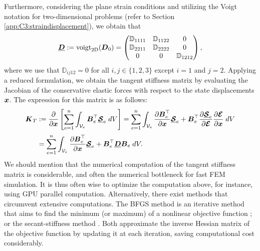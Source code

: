 %
Furthermore, considering the plane strain conditions and utilizing the Voigt notation for two-dimensional problems (refer to Section \ref{app:C3:straindisplacement}), we obtain that
%
\begin{equation}
\underline{{\boldsymbol{D}}} := \textrm{voigt}_{\textrm{2D}}({\boldsymbol{D}}_0) = \begin{pmatrix}
\mathbb{D}_{1111} & \mathbb{D}_{1122} & 0 \\
\mathbb{D}_{2211} & \mathbb{D}_{2222} & 0 \\
0 & 0 & \mathbb{D}_{1212} 
\end{pmatrix},
\end{equation}
where we use that $\mathbb{D}_{ij12} = 0$ for all $i,j \in \{1,2,3\}$ except $i=1$ and $j=2$. Applying a reduced formulation, we obtain the tangent stiffness matrix by evaluating the Jacobian of the conservative elastic forces with respect to the state displacements ${\boldsymbol{x}}$. The expression for this matrix is as follows:
%
\begin{align}
{\boldsymbol{K}}_T & := \frac{\partial}{\partial {\boldsymbol{x}}}  \left[ \sum_{e=1}^{n} \int_{\mathcal{V}_e} {\boldsymbol{B}}_e^\top \underline{\boldsymbol{\mathcal{S}}}_e \; dV \right] = \sum_{e=1}^{n} \int_{\mathcal{V}_e} \frac{\partial {\boldsymbol{B}}_e^\top}{\partial {\boldsymbol{x}}} \underline{\boldsymbol{\mathcal{S}}}_e +  {\boldsymbol{B}}_e^\top \frac{\partial \underline{\boldsymbol{\mathcal{S}}}_e}{\partial \boldsymbol{\mathcal{E}}} \frac{\partial \boldsymbol{\mathcal{E}}}{\partial {\boldsymbol{x}}} \; dV \notag \\[0.25em]
& = \sum_{e=1}^{n} \int_{\mathcal{V}_e} \frac{\partial {\boldsymbol{B}}_e^\top}{\partial {\boldsymbol{x}}} \underline{\boldsymbol{\mathcal{S}}}_e +  {\boldsymbol{B}}_e^\top \underline{{\boldsymbol{D}}} {\boldsymbol{B}}_e \; dV.
\end{align}
%
We should mention that the numerical computation of the tangent stiffness matrix is considerable, and often the numerical bottleneck for fast FEM simulation. It is thus often wise to optimize the computation above, for instance, using GPU parallel computation. Alternatively, there exist methods that circumvent extensive computations. The BFGS method is an iterative method that aims to find the minimum (or maximum) of a nonlinear objective function \cite{Holzapfel2002}; or the secant-stiffness method \cite{Kim2018}. Both approximate the inverse Hessian matrix of the objective function by updating it at each iteration, saving computational cost considerably. 